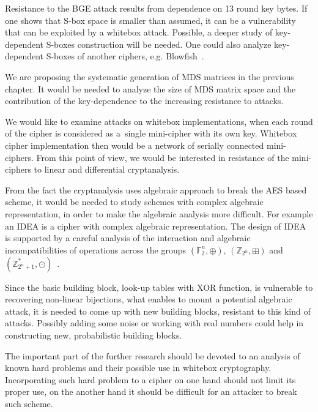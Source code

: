 \documentclass[11pt,oneside,final]{fithesis2}
\begin{document}
    Resistance to the BGE attack results from dependence on 13 round key bytes. If one shows that S-box space is smaller than assumed, it can be a vulnerability 
    that can be exploited by a whitebox attack. Possible, a deeper study of key-dependent S-boxes construction will be needed. One could also analyze key-dependent
    S-boxes of another ciphers, e.g. Blowfish~\citep{Schneier:1993:DNV:647930.740558}. 
    
    We are proposing the systematic generation of MDS matrices in the previous chapter. It would be needed to analyze the size of MDS matrix space and
    the contribution of the key-dependence to the increasing resistance to attacks.
    
    We would like to examine attacks on whitebox implementations, when each round of the cipher is considered as a~single mini-cipher with its own key. Whitebox
    cipher implementation then would be a network of serially connected mini-ciphers. From this point of view, we would be interested in resistance of the mini-ciphers
    to linear and differential cryptanalysis.

    From the fact the cryptanalysis uses algebraic approach to break the AES based scheme, it would be needed to study schemes with complex algebraic 
    representation, in order to make the algebraic analysis more difficult. For example an IDEA \citep{Lai:1991:PNB:112331.112375} is a cipher 
    with complex algebraic representation. The design of IDEA is supported by a careful analysis of the interaction and algebraic incompatibilities 
    of operations across the groups $\left(\mathbb{F}_2^n, \oplus\right)$, $\left(\mathbb{Z}_{2^n}, \boxplus\right)$ 
    and $\left(\mathbb{Z}^{\ast}_{2^n+1}, \odot\right)$~\citep{Menezes:1996:HAC:548089}.
    
    Since the basic building block, look-up tables with XOR function, is vulnerable to recovering non-linear bijections, what enables to mount 
    a potential algebraic attack, it is needed to come up with new building blocks, resistant to this kind of attacks. Possibly adding some noise or working
    with real numbers could help in constructing new, probabilistic building blocks.
    
    The important part of the further research should be devoted to an analysis of known hard problems and their possible use in whitebox cryptography.
    Incorporating such hard problem to a cipher on one hand should not limit its proper use, on the another hand it should be difficult for an attacker to break
    such scheme.     
\end{document}
